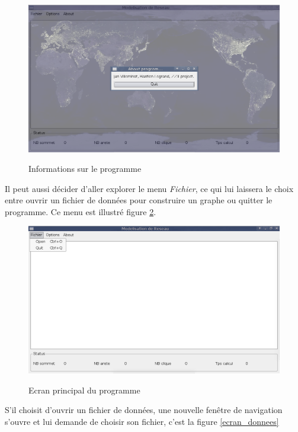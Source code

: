 \begin{figure}[H]
\centering
 \fbox
 {
 \includegraphics[width=16cm]{./schema/capture_ecran_about.png}
 }
  \caption{\label{ecran_about}Informations sur le programme}
\end{figure}

\par
Il peut aussi d\'ecider d'aller explorer le menu \textit{Fichier}, ce qui lui laissera le choix entre ouvrir un fichier de donn\'ees pour construire un graphe ou quitter le programme. Ce menu est illustr\'e figure \ref{ecran_fichier}.

\begin{figure}[H]
\centering
 \fbox
 {
 \includegraphics[width=16cm]{./schema/capture_ecran_fichier.png}
 }
  \caption{\label{ecran_fichier}Ecran principal du programme}
\end{figure}

S'il choisit d'ouvrir un fichier de donn\'ees, une nouvelle fen\^etre de navigation s'ouvre et lui demande de choisir son fichier, c'est la figure \ref{ecran_donnees}

